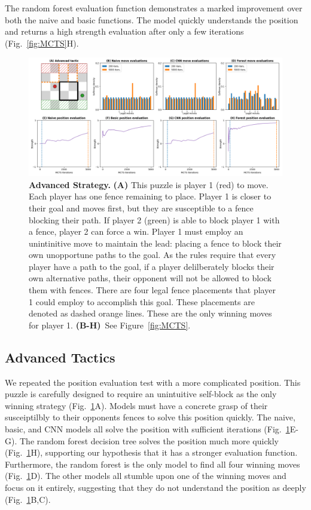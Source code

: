\documentclass[10pt]{article}
\begin{document}
The random forest evaluation function demonstrates a marked improvement over both the naive and basic functions. The model quickly understands the position and returns a high strength evaluation after only a few iterations (Fig.~\ref{fig:MCTS}H).


\begin{figure}[H]
    \centering
    \includegraphics[width=\linewidth]{Adv_tactic.png}
    \caption{\textbf{Advanced Strategy.} \textbf{(A)} This puzzle is player 1 (red) to move. Each player has one fence remaining to place. Player 1 is closer to their goal and moves first, but they are susceptible to a fence blocking their path. If player 2 (green) is able to block player 1 with a fence, player 2 can force a win. Player 1 must employ an unintinitive move to maintain the lead: placing a fence to block their own unopportune paths to the goal. As the rules require that every player have a path to the goal, if a player delilberately blocks their own alternative paths, their opponent will not be allowed to block them with fences. There are four legal fence placements that player 1 could employ to accomplish this goal. These placements are denoted as dashed orange lines. These are the only winning moves for player 1. \textbf{(B-H)}~See Figure~\ref{fig:MCTS}.}
    \label{fig:AdvTactic}
\end{figure}

\subsection{Advanced Tactics}

We repeated the position evaluation test with a more complicated position. This puzzle is carefully designed to require an unintuitive self-block as the only winning strategy (Fig.~\ref{fig:AdvTactic}A). Models must have a concrete grasp of their susceiptilbly to their opponents fences to solve this position quickly. The naive, basic, and CNN models all solve the position with sufficient iterations (Fig.~\ref{fig:AdvTactic}E-G). The random forest decision tree solves the position much more quickly (Fig.~\ref{fig:AdvTactic}H), supporting our hypothesis that it has a stronger evaluation function. Furthermore, the random forest is the only model to find all four winning moves (Fig.~\ref{fig:AdvTactic}D). The other models all stumble upon one of the winning moves and focus on it entirely, suggesting that they do not understand the position as deeply (Fig.~\ref{fig:AdvTactic}B,C).
\end{document}
